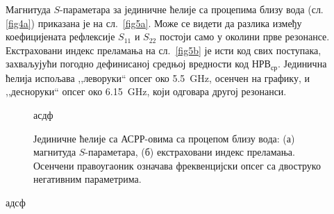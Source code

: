 Магнитуда $S$-параметара за јединичне ћелије са процепима близу вода (сл. \ref{fig4a}) приказана је на сл.~\ref{fig5a}. Може се видети да разлика између коефицијената рефлексије $S_{11}$ и $S_{22}$ постоји само у околини прве резонансе. Екстраховани индекс преламања на сл.~\ref{fig5b} је исти код свих поступака, захваљујући погодно дефинисаној средњој вредности код $НРВ_{ср}$. Јединична ћелија испољава ,,леворуки`` опсег око \SI{5.5}{\giga\hertz}, осенчен на графику, и ,,десноруки`` опсег око \SI{6.15}{\giga\hertz}, који одговара другој резонанси.
\begin{figure}[!t]
\hfill
{}
\caption{Јединичне ћелије са АСРР-овима са процепом близу вода: (а) магнитуда $S$-параметара, (б) екстраховани индекс преламања. Осенчени правоугаоник означава фреквенцијски опсег са двоструко негативним параметрима.}
\label{fig5}асдф
\end{figure}адсф 

